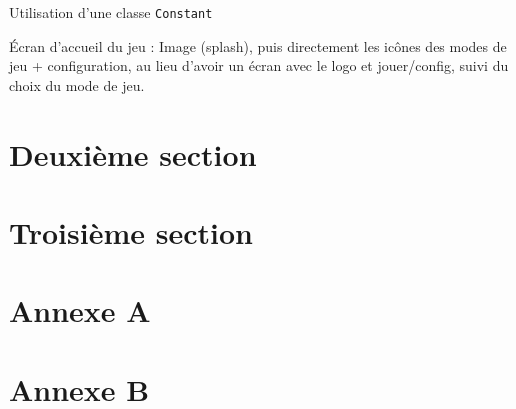 \documentclass[a4paper,11pt,french]{article}
\begin{document}
Utilisation d'une classe \verb!Constant!

Écran d'accueil du jeu : Image (splash), puis directement les icônes des modes de jeu + configuration, au lieu d'avoir un écran avec le logo et jouer/config, suivi du choix du mode de jeu.

\section{Deuxième section}
\section{Troisième section}
\newpage
\appendix
\section{Annexe A}
\section{Annexe B}
\end{document}
